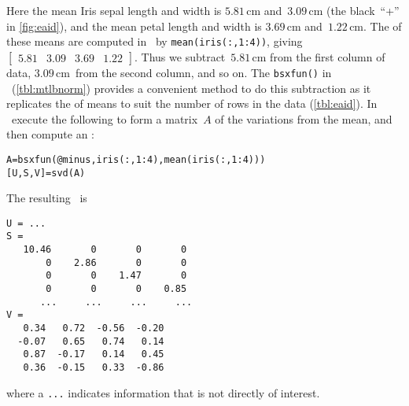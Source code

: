 \begin{example}
\begin{solution}
\begin{enumerate}
Here the mean Iris sepal length and width is \(5.81\)\,cm and~\(3.09\)\,cm (the black~``+'' in \autoref{fig:eaid}), and the mean petal length and width is \(3.69\)\,cm and~\(1.22\)\,cm.
The  of these means are computed in \script\ by \verb|mean(iris(:,1:4))|, giving \(\begin{bmatrix} 5.81&3.09&3.69&1.22 \end{bmatrix}\).
Thus we subtract~\(5.81\)\,cm from the first column of data, \(3.09\)\,cm~from the second column, and so on.
The \verb|bsxfun()| in \script\ (\autoref{tbl:mtlbnorm}) provides a convenient method to do this subtraction as it replicates the  of means to suit the number of rows in the data (\autoref{tbl:eaid}).
In \script\ execute the following to form a matrix~\(A\) of the variations from the mean, and then compute an \svd:%
\begin{verbatim}
A=bsxfun(@minus,iris(:,1:4),mean(iris(:,1:4)))
[U,S,V]=svd(A)
\end{verbatim}
\setbox\ajrqrbox\hbox{}%
\marginpar{\usebox{\ajrqrbox\\[2ex]}}%
The resulting \svd\ is \twodp
\begin{verbatim}
U = ...
S =
   10.46       0       0       0
       0    2.86       0       0
       0       0    1.47       0
       0       0       0    0.85
      ...     ...     ...     ...
V =
   0.34   0.72  -0.56  -0.20
  -0.07   0.65   0.74   0.14
   0.87  -0.17   0.14   0.45
   0.36  -0.15   0.33  -0.86
\end{verbatim}
where a \verb|...| indicates information that is not directly of interest.


\end{enumerate}
\end{solution}
\end{example}
